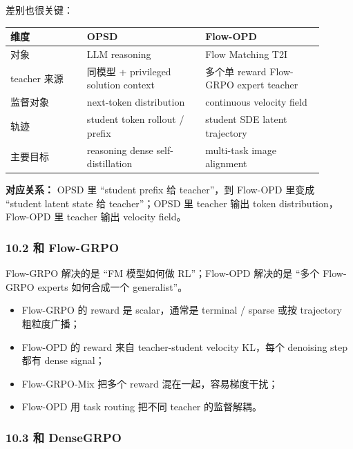 差别也很关键：

\begin{center}
\small
\begin{tabular}{p{0.22\linewidth}p{0.34\linewidth}p{0.34\linewidth}}
\toprule
\textbf{维度} & \textbf{OPSD} & \textbf{Flow-OPD} \\
\midrule
对象 & LLM reasoning & Flow Matching T2I \\
teacher 来源 & 同模型 + privileged solution context & 多个单 reward Flow-GRPO expert teacher \\
监督对象 & next-token distribution & continuous velocity field \\
轨迹 & student token rollout / prefix & student SDE latent trajectory \\
主要目标 & reasoning dense self-distillation & multi-task image alignment \\
\bottomrule
\end{tabular}
\end{center}

\begin{intubox}
\textbf{对应关系：} OPSD 里 ``student prefix 给 teacher''，到 Flow-OPD 里变成 ``student latent state 给 teacher''；OPSD 里 teacher 输出 token distribution，Flow-OPD 里 teacher 输出 velocity field。
\end{intubox}

\subsubsection{10.2 和 Flow-GRPO}

Flow-GRPO 解决的是 ``FM 模型如何做 RL''；Flow-OPD 解决的是 ``多个 Flow-GRPO experts 如何合成一个 generalist''。

\begin{itemize}[leftmargin=1.5em]
  \item Flow-GRPO 的 reward 是 scalar，通常是 terminal / sparse 或按 trajectory 粗粒度广播；
  \item Flow-OPD 的 reward 来自 teacher-student velocity KL，每个 denoising step 都有 dense signal；
  \item Flow-GRPO-Mix 把多个 reward 混在一起，容易梯度干扰；
  \item Flow-OPD 用 task routing 把不同 teacher 的监督解耦。
\end{itemize}

\subsubsection{10.3 和 DenseGRPO}

